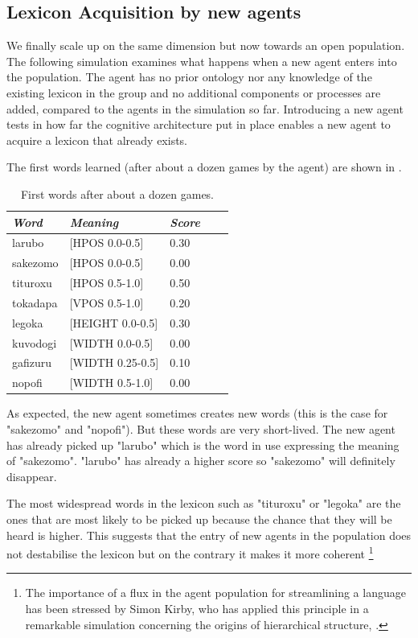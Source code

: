 \subsection{Lexicon Acquisition by new agents}

We finally scale up on the same dimension but 
now towards an open population. The following 
simulation examines what happens when a new agent 
enters into the population. The agent has no 
prior ontology nor any knowledge of the existing
lexicon in the group and no additional components
or processes are added, compared to the agents
in the simulation so far. Introducing a new 
agent tests in how far the cognitive architecture
put in place enables a new agent to acquire a 
lexicon that already exists. 

The first words learned (after about a dozen 
games by the agent) are shown in . 
\begin{table}
\begin{center}
\begin{tabular}{ l  l  l  l  l } \hline
{\it Word} & {\it Meaning} & {\it Score} \\ \hline
larubo  & [HPOS 0.0-0.5] & 0.30 \\ \hline
sakezomo &  [HPOS 0.0-0.5] & 0.00 \\ \hline
tituroxu &  [HPOS 0.5-1.0] & 0.50 \\ \hline
tokadapa & [VPOS 0.5-1.0] & 0.20 \\ \hline
legoka   & [HEIGHT 0.0-0.5] & 0.30 \\ \hline
kuvodogi  & [WIDTH 0.0-0.5] & 0.00 \\ \hline
gafizuru &  [WIDTH 0.25-0.5] & 0.10  \\ \hline
nopofi  & [WIDTH 0.5-1.0] & 0.00 \\ \hline
\end{tabular}
\caption{\label{tab:first} First words after about a dozen games.}
\end{center}
\end{table}

As expected, the new 
agent sometimes creates new words (this is the case 
for "sakezomo" and "nopofi"). But these words are 
very short-lived. The new agent has already picked up 
"larubo" which is the word in use expressing the 
meaning of "sakezomo". "larubo" has already a higher 
score so "sakezomo" will definitely disappear. 

The most widespread words in the lexicon 
such as "tituroxu" or "legoka" are the ones that 
are most likely to be picked up because the chance
that they will be heard is higher. This suggests
that the entry of new agents in the population does
not destabilise the lexicon but on the contrary 
it makes it more coherent \footnote{The importance of a flux in the agent population for
streamlining a language has been stressed by Simon Kirby, who 
has applied this principle in a remarkable simulation 
concerning the origins of hierarchical structure, \cite{Kirby:1999}.}

